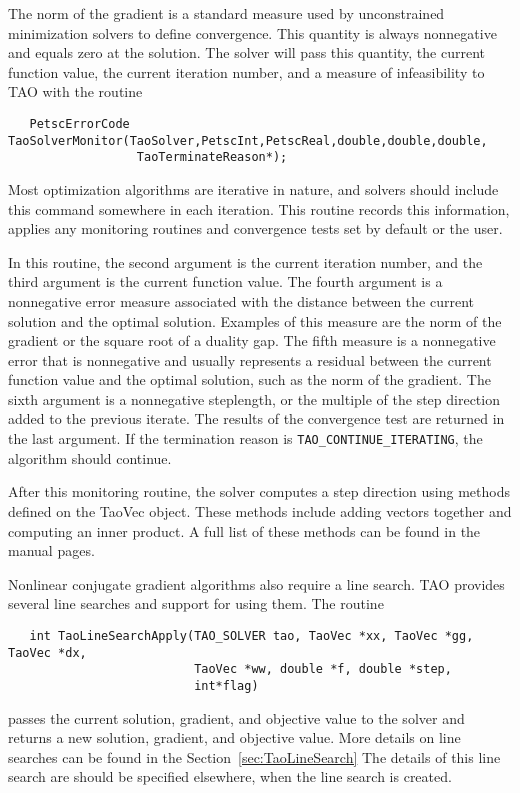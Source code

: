 The norm of the gradient is a standard measure used
by unconstrained minimization solvers to define convergence.
This quantity is always nonnegative and equals zero at the solution.  
The solver will pass this quantity, the current
function value, the current iteration number, and a measure of
infeasibility to TAO with the routine
\begin{verbatim}
   PetscErrorCode TaoSolverMonitor(TaoSolver,PetscInt,PetscReal,double,double,double,
                  TaoTerminateReason*);
\end{verbatim}
Most optimization algorithms are iterative in nature, and solvers should
include this command somewhere in each iteration.  This routine
records this information, applies any monitoring routines and 
convergence tests set by default or the user.

In this routine, the second argument is the current
iteration number, and the third argument is the current function value.
The fourth argument is a nonnegative error measure associated with the
distance between the current solution and the optimal solution.  Examples
of this measure are the norm of the gradient or the square root of a duality 
gap. The fifth measure is a nonnegative error 
that is nonnegative and usually
represents a residual between the current function value and the
optimal solution, such as the norm of the
gradient.  The sixth argument is a nonnegative steplength, 
or the multiple of the step direction added to the previous iterate.
The results of the convergence test are returned in the last argument.
If the termination reason is {\tt TAO\_CONTINUE\_ITERATING}, the
algorithm should continue.

After this monitoring routine, the solver computes a step direction
using methods defined on the TaoVec object.  These methods include
adding vectors together and computing an inner product.  A full list
of these methods can be found in the manual pages.

Nonlinear conjugate gradient algorithms also require a line search.  TAO
provides several line searches and support for using them.
The routine
\begin{verbatim}
   int TaoLineSearchApply(TAO_SOLVER tao, TaoVec *xx, TaoVec *gg, TaoVec *dx,
                          TaoVec *ww, double *f, double *step,
                          int*flag)
\end{verbatim}
passes the current solution, gradient, and objective value to the
solver and returns a new solution, gradient, and objective value.  More
details on line searches can be found in the Section~\ref{sec:TaoLineSearch}
The details of this line search are should be specified elsewhere, when
the line search is created.

